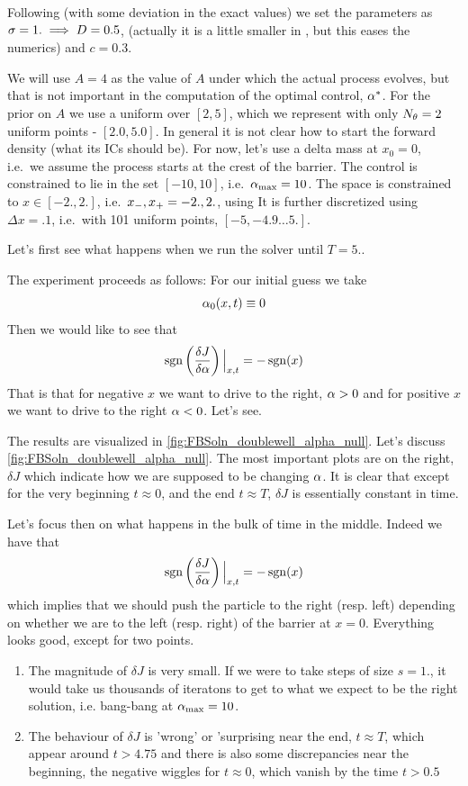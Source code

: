 \documentclass{article}
\begin{document}
Following \cite{Lin} (with some deviation in the exact values) we set the
parameters as ${\sigma } = 1. \implies D = 0.5$, (actually it is a little smaller in
\cite{Lin}, but this eases the numerics) and $c = 0.3$.

We will use $A = 4$ as the value of $A$ under which the actual process evolves,
but that is not important in the computation of the optimal control, ${\alpha}^*$. For
the prior on $A$ we use a uniform over $[2,5]$, which we represent with
only $N_{\theta} = 2$ uniform points - $[2.0, 5.0]$.  In general it is
not clear how to start the forward density (what its ICs should be). 
For now, let's use a delta mass at $x_0 = 0$, i.e.\ we assume the process starts
at the crest of the barrier. The control is constrained to lie in the set $[-10, 10]$, i.e.\ ${ {\alpha}_{\textrm{max}} }
= 10$. The space is constrained to $x \in [-2.,2.]$, i.e.\ ${ x_{-} }, { x_{+} } =
-2.,2.$, using  It is further discretized using $\Delta x = .1$, i.e.\ with 101
uniform points, $[-5, -4.9\ldots 5.]$.

Let's first see what happens when we run the solver until $T = 5$..

The experiment proceeds as follows: For our initial guess we take $${\alpha}_0(x,t)
\equiv 0$$ Then we would like to see that 
$$ \operatorname{sgn} \left(\frac {\delta J}{\delta {\alpha}}\right) \Big|_{x,t} = - \operatorname{sgn}(x)$$
That is that for negative $x$ we want to drive to the right, ${\alpha} > 0$ and for
positive $x$ we want to drive to the right ${\alpha} < 0$. 
Let's see.  

The results are visualized in \cref{fig:FBSoln_doublewell_alpha_null}. Let's
discuss \cref{fig:FBSoln_doublewell_alpha_null}. The most important plots are on
the right, $\delta J$ which indicate how we are supposed to be changing ${\alpha}$. 
It is clear that except for the very beginning $t \approx 0$, and the end $t
\approx T$, $\delta J$ is essentially constant in time.  

Let's focus then on what happens in the bulk of time in the middle. Indeed we  
have that 
$$
\operatorname{sgn} \left(\frac {\delta J}{\delta {\alpha}}\right) \Big|_{x,t} = - \operatorname{sgn}(x)
$$
which implies that we should push the particle to the right (resp. left)
depending on whether we are to the left (resp. right) of the barrier at $x=0$.
Everything looks good, except for two points.
\begin{enumerate}
  \item The magnitude of $\delta J$ is very small. If we were to take steps of
  size $s=1.$, it would take us thousands of iteratons to get to what we expect to be
the right solution, i.e. bang-bang at ${ {\alpha}_{\textrm{max}} } = 10$.
\item The behaviour of $\delta J$ is 'wrong' or 'surprising near the end, $t
\approx T$, which appear around $t>4.75$ and there is also some discrepancies
near the beginning, the negative wiggles for $t \approx 0$, which vanish by the
time $t > 0.5$
\end{enumerate}
\end{document}
